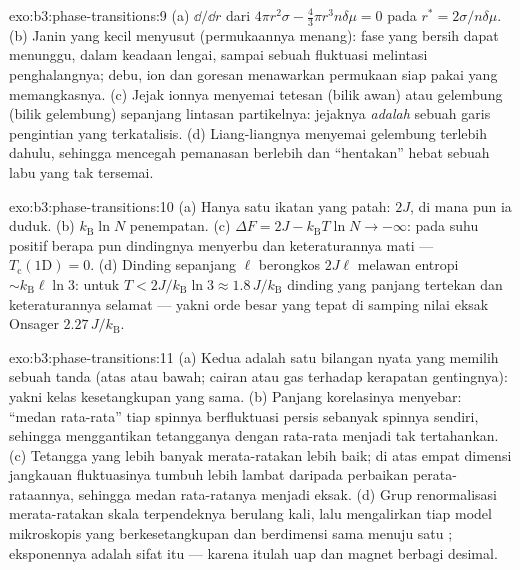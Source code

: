 \begin{solution}{exo:b3:phase-transitions:9}
(a) $\dd/\dd r$ dari $4\pi r^2\sigma - \tfrac43\pi r^3n\delta\mu = 0$
pada $r^* = 2\sigma/n\delta\mu$. (b) Janin yang kecil menyusut (permukaannya
menang): fase yang bersih dapat menunggu, dalam keadaan lengai, sampai
sebuah fluktuasi melintasi penghalangnya; debu, ion dan goresan menawarkan
permukaan siap pakai yang memangkasnya. (c) Jejak ionnya menyemai tetesan
(bilik awan) atau gelembung (bilik gelembung) sepanjang lintasan
partikelnya: jejaknya \emph{adalah} sebuah garis pengintian yang
terkatalisis. (d) Liang-liangnya menyemai gelembung terlebih dahulu,
sehingga mencegah pemanasan berlebih dan ``hentakan'' hebat sebuah labu
yang tak tersemai.
\end{solution}

\begin{solution}{exo:b3:phase-transitions:10}
(a) Hanya satu ikatan yang patah: $2J$, di mana pun ia duduk. (b)
$k_{\text{B}}\ln N$ penempatan. (c) $\Delta F = 2J -
k_{\text{B}}T\ln N \to -\infty$: pada suhu positif berapa pun
dindingnya menyerbu dan keteraturannya mati --- $T_{\text{c}}(1\text{D}) = 0$. (d)
Dinding sepanjang $\ell$ berongkos $2J\ell$ melawan entropi
$\sim k_{\text{B}}\ell\ln3$: untuk $T < 2J/k_{\text{B}}\ln3 \approx
1.8\,J/k_{\text{B}}$ dinding yang panjang tertekan dan keteraturannya
selamat --- yakni orde besar yang tepat di samping nilai eksak Onsager
$2.27\,J/k_{\text{B}}$.
\end{solution}

\begin{solution}{exo:b3:phase-transitions:11}
(a) Kedua  adalah satu bilangan nyata yang
memilih sebuah tanda (atas atau bawah; cairan atau gas terhadap kerapatan
gentingnya): yakni kelas kesetangkupan yang sama. (b) Panjang korelasinya
menyebar: ``medan rata-rata'' tiap spinnya berfluktuasi persis sebanyak
spinnya sendiri, sehingga menggantikan tetangganya dengan rata-rata
menjadi tak tertahankan. (c) Tetangga yang lebih banyak merata-ratakan
lebih baik; di atas empat dimensi jangkauan fluktuasinya tumbuh lebih
lambat daripada perbaikan perata-rataannya, sehingga medan rata-ratanya
menjadi eksak. (d) Grup renormalisasi merata-ratakan skala terpendeknya
berulang kali, lalu mengalirkan tiap model mikroskopis yang berkesetangkupan
dan berdimensi sama menuju satu ; eksponennya adalah sifat
 itu --- karena itulah uap dan magnet berbagi desimal.
\end{solution}

